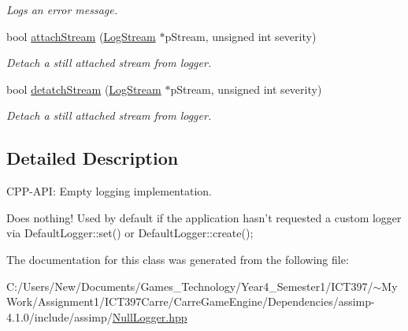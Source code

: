 \begin{CompactItemize}
\begin{CompactList}\small\item\em Logs an error message. \item\end{CompactList}\item 
\hypertarget{class_assimp_1_1_null_logger_31c05ecaee392b5fd34fd2dfd1cca559}{
bool \hyperlink{class_assimp_1_1_null_logger_31c05ecaee392b5fd34fd2dfd1cca559}{attachStream} (\hyperlink{class_assimp_1_1_log_stream}{LogStream} $\ast$pStream, unsigned int severity)}
\label{class_assimp_1_1_null_logger_31c05ecaee392b5fd34fd2dfd1cca559}

\begin{CompactList}\small\item\em Detach a still attached stream from logger. \item\end{CompactList}\item 
\hypertarget{class_assimp_1_1_null_logger_b49b14a0045aab73b813a448b5aa77b4}{
bool \hyperlink{class_assimp_1_1_null_logger_b49b14a0045aab73b813a448b5aa77b4}{detatchStream} (\hyperlink{class_assimp_1_1_log_stream}{LogStream} $\ast$pStream, unsigned int severity)}
\label{class_assimp_1_1_null_logger_b49b14a0045aab73b813a448b5aa77b4}

\begin{CompactList}\small\item\em Detach a still attached stream from logger. \item\end{CompactList}\end{CompactItemize}


\subsection{Detailed Description}
CPP-API: Empty logging implementation. 

Does nothing! Used by default if the application hasn't requested a custom logger via DefaultLogger::set() or DefaultLogger::create(); 

The documentation for this class was generated from the following file:\begin{CompactItemize}
\item 
C:/Users/New/Documents/Games\_\-Technology/Year4\_\-Semester1/ICT397/$\sim$My Work/Assignment1/ICT397Carre/CarreGameEngine/Dependencies/assimp-4.1.0/include/assimp/\hyperlink{_null_logger_8hpp}{NullLogger.hpp}\end{CompactItemize}
